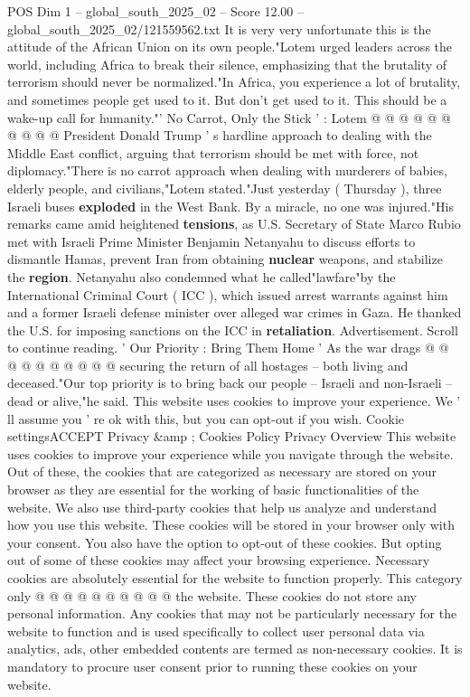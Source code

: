 \begin{textsample}{POS Dim 1 – global\_south\_2025\_02 – Score 12.00 – global\_south\_2025\_02/121559562.txt}
It is very very unfortunate this is the attitude of the African Union on its own people."Lotem urged leaders across the world, including Africa to break their silence, emphasizing that the brutality of terrorism should never be normalized."In Africa, you experience a lot of brutality, and sometimes people get used to it.
But don't get used to it.
This should be a wake-up call for humanity."' No Carrot, Only the Stick ' : Lotem @ @ @ @ @ @ @ @ @ @ President Donald Trump ' s hardline approach to dealing with the Middle East conflict, arguing that terrorism should be met with force, not diplomacy."There is no carrot approach when dealing with murderers of babies, elderly people, and civilians,"Lotem stated."Just yesterday ( Thursday ), three Israeli buses \textbf{exploded} in the West Bank.
By a miracle, no one was injured."His remarks came amid heightened \textbf{tensions}, as U.S.
Secretary of State Marco Rubio met with Israeli Prime Minister Benjamin Netanyahu to discuss efforts to dismantle Hamas, prevent Iran from obtaining \textbf{nuclear} weapons, and stabilize the \textbf{region}.
Netanyahu also condemned what he called"lawfare"by the International Criminal Court ( ICC ), which issued arrest warrants against him and a former Israeli defense minister over alleged war crimes in Gaza.
He thanked the U.S. for imposing sanctions on the ICC in \textbf{retaliation}.
Advertisement.
Scroll to continue reading. ' Our Priority : Bring Them Home ' As the war drags @ @ @ @ @ @ @ @ @ @ securing the return of all hostages -- both living and deceased."Our top priority is to bring back our people -- Israeli and non-Israeli -- dead or alive,"he said.
This website uses cookies to improve your experience.
We ' ll assume you ' re ok with this, but you can opt-out if you wish.
Cookie settingsACCEPT Privacy \&amp ; Cookies Policy Privacy Overview This website uses cookies to improve your experience while you navigate through the website.
Out of these, the cookies that are categorized as necessary are stored on your browser as they are essential for the working of basic functionalities of the website.
We also use third-party cookies that help us analyze and understand how you use this website.
These cookies will be stored in your browser only with your consent.
You also have the option to opt-out of these cookies.
But opting out of some of these cookies may affect your browsing experience.
Necessary cookies are absolutely essential for the website to function properly.
This category only @ @ @ @ @ @ @ @ @ @ the website.
These cookies do not store any personal information.
Any cookies that may not be particularly necessary for the website to function and is used specifically to collect user personal data via analytics, ads, other embedded contents are termed as non-necessary cookies.
It is mandatory to procure user consent prior to running these cookies on your website.

\end{textsample}
